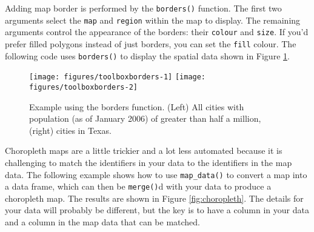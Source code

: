 Adding map border is performed by the \texttt{borders()} function. The
first two arguments select the \texttt{map} and \texttt{region} within
the map to display. The remaining arguments control the appearance of
the borders: their \texttt{colour} and \texttt{size}. If you'd prefer
filled polygons instead of just borders, you can set the \texttt{fill}
colour. The following code uses \texttt{borders()} to display the
spatial data shown in Figure \ref{fig:borders}. 

\begin{Shaded}
\begin{Highlighting}[]
\NormalTok{(}\NormalTok{)}
\StringTok{ }\StringTok{ }\NormalTok{)}
 \StringTok{ }\NormalTok{(}\NormalTok{, } \NormalTok{)}

\StringTok{ }\NormalTok{)}
\StringTok{  }\NormalTok{(}\NormalTok{, }\NormalTok{, } \NormalTok{) +}
\StringTok{  }\NormalTok{(} \NormalTok{)}
\end{Highlighting}
\end{Shaded}

\begin{figure}

{\centering \texttt{[image: figures/toolboxborders-1]} \texttt{[image: figures/toolboxborders-2]} 

}

\caption{Example using the borders function.  (Left) All cities with population (as of January 2006) of greater than half a million, (right) cities in Texas.\label{fig:borders}}
\end{figure}

Choropleth maps are a little trickier and a lot less automated because
it is challenging to match the identifiers in your data to the
identifiers in the map data. The following example shows how to use
\texttt{map\_data()} to convert a map into a data frame, which can then
be \texttt{merge()}d with your data to produce a choropleth map. The
results are shown in Figure \ref{fig:choropleth}. The details for your
data will probably be different, but the key is to have a column in your
data and a column in the map data that can be matched.

